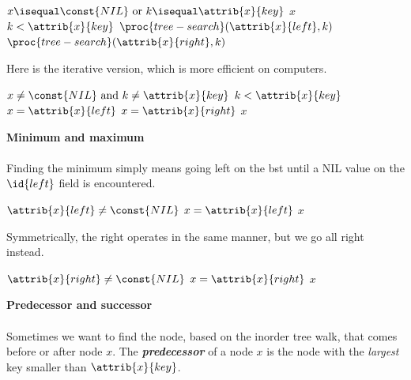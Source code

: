 \documentclass[12pt]{article}
\begin{document}
\begin{codebox}
\li \If $x \isequal \const{NIL} \text{ or } k \isequal \attrib{x}{key}$
\li \Then
        \Return $x$
    \End
\li \If $k < \attrib{x}{key}$ 
\li \Then
        \Return $\proc{tree-search}(\attrib{x}{left}, k)$
\li \Else
\li     \Return $\proc{tree-search}(\attrib{x}{right}, k)$
    \End
\end{codebox}

Here is the iterative version, which is more efficient on computers.

\begin{codebox}
\li \While $x \neq \const{NIL} \text{ and } k \neq \attrib{x}{key}$
    \Do
\li     \If $k < \attrib{x}{key}$ 
        \Then
\li         $x = \attrib{x}{left}$
\li     \Else
\li         $x = \attrib{x}{right}$ 
        \End
    \End
\li \Return $x$
\end{codebox}

\textbf{Minimum and maximum}
\\ \\
Finding the minimum simply means going left on the bst until a NIL value on the $\id{left}$ field is encountered.

\begin{codebox}
\li \While $\attrib{x}{left} \neq \const{NIL}$
    \Do
    \li     $x = \attrib{x}{left}$
    \End
\li \Return $x$
\end{codebox}

Symmetrically, the right operates in the same manner, but we go all right instead.

\begin{codebox}
\li \While $\attrib{x}{right} \neq \const{NIL}$
    \Do
    \li     $x = \attrib{x}{right}$
    \End
\li \Return $x$
\end{codebox}

\newpage

\textbf{Predecessor and successor}
\\ \\
Sometimes we want to find the node, based on the inorder tree walk, that comes before or after node $x$. The \textbf{\emph{predecessor}} of a node $x$ is the node with the \textit{largest} key smaller than $\attrib{x}{key}$. 
\end{document}
